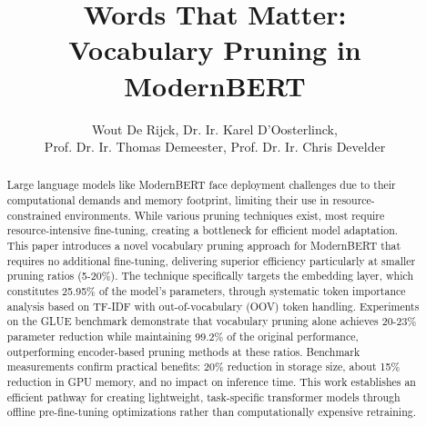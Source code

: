 \documentclass[twocolumn]{article}
\title{\huge \textbf{Words That Matter:\\ Vocabulary Pruning in ModernBERT}}
\author{Wout De Rijck, Dr. Ir. Karel D'Oosterlinck, \\ Prof. Dr. Ir. Thomas Demeester, Prof. Dr. Ir. Chris Develder}
\date{} %
\begin{document}
\maketitle







\begin{abstract}
Large language models like ModernBERT face deployment challenges due to their computational demands and memory footprint, limiting their use in resource-constrained environments. While various pruning techniques exist, most require resource-intensive fine-tuning, creating a bottleneck for efficient model adaptation. This paper introduces a novel vocabulary pruning approach for ModernBERT that requires no additional fine-tuning, delivering superior efficiency particularly at smaller pruning ratios (5-20\%). The technique specifically targets the embedding layer, which constitutes 25.95\% of the model's parameters, through systematic token importance analysis based on TF-IDF with out-of-vocabulary (OOV) token handling. Experiments on the GLUE benchmark demonstrate that vocabulary pruning alone achieves 20-23\% parameter reduction while maintaining 99.2\% of the original performance, outperforming encoder-based pruning methods at these ratios. 
Benchmark measurements confirm practical benefits: 20\% reduction in storage size, about 15\% reduction in GPU memory, and no impact on inference time. This work establishes an efficient pathway for creating lightweight, task-specific transformer models through offline pre-fine-tuning optimizations rather than computationally expensive retraining.
\end{abstract}

\end{document}

